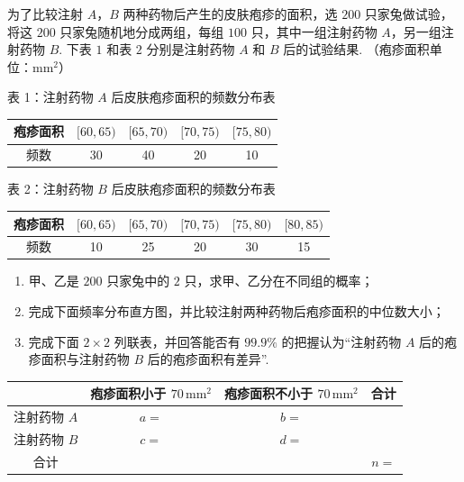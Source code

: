 \begin{problem}
为了比较注射 \(A\)，\(B\) 两种药物后产生的皮肤疱疹的面积，选 \(200\) 只家兔做试验，将这 \(200\) 只家兔随机地分成两组，每组 \(100\) 只，其中一组注射药物 \(A\)，另一组注射药物 \(B\). 下表 \(1\) 和表 \(2\) 分别是注射药物 \(A\) 和 \(B\) 后的试验结果. （疱疹面积单位：\(\mathrm{mm}^2\)）

\begin{center}
表 1：注射药物 \(A\) 后皮肤疱疹面积的频数分布表

\begin{tabular}{|c|c|c|c|c|}
\hline
疱疹面积 & \([60,65)\) & \([65,70)\) & \([70,75)\) & \([75,80)\) \\
\hline
频数 & 30 & 40 & 20 & 10 \\
\hline
\end{tabular}
\end{center}

\begin{center}
表 2：注射药物 \(B\) 后皮肤疱疹面积的频数分布表

\begin{tabular}{|c|c|c|c|c|c|}
\hline
疱疹面积 & \([60,65)\) & \([65,70)\) & \([70,75)\) & \([75,80)\) & \([80,85)\) \\
\hline
频数 & 10 & 25 & 20 & 30 & 15 \\
\hline
\end{tabular}
\end{center}

\begin{enumerate}
\item 甲、乙是 \(200\) 只家兔中的 \(2\) 只，求甲、乙分在不同组的概率；
\item 完成下面频率分布直方图，并比较注射两种药物后疱疹面积的中位数大小；
\item 完成下面 \(2\times2\) 列联表，并回答能否有 \(99.9\%\) 的把握认为“注射药物 \(A\) 后的疱疹面积与注射药物 \(B\) 后的疱疹面积有差异”.
\end{enumerate}


\begin{center}
\begin{tabular}{|c|c|c|c|}
\hline
 & 疱疹面积小于 \(70\,\mathrm{mm}^2\) & 疱疹面积不小于 \(70\,\mathrm{mm}^2\) & 合计 \\
\hline
注射药物 \(A\) & \(a=\)\fillinblank{} & \(b=\)\fillinblank{} &\fillinblank{} \\
\hline
注射药物 \(B\) & \(c=\)\fillinblank{} & \(d=\)\fillinblank{} &\fillinblank{} \\
\hline
合计 &\fillinblank{} &\fillinblank{} & \(n=\)\fillinblank{} \\
\hline
\end{tabular}
\end{center}


\end{problem}
